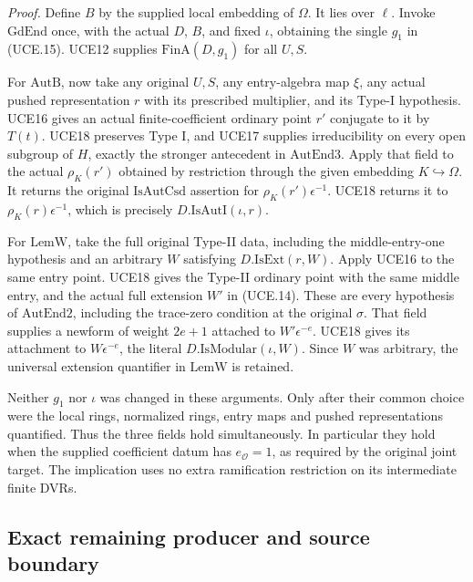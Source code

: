 \emph{Proof.}
Define \(B\) by the supplied local embedding of \(\Omega\).
It lies over \(\ell\).  Invoke \(\mathrm{GdEnd}\) once, with
the actual \(D\), \(B\), and fixed \(\iota\), obtaining the
single \(g_1\) in (UCE.15).  UCE12 supplies
\(\mathrm{FinA}(D,g_1)\) for all \(U,S\).

For \(\mathrm{AutB}\), now take any original \(U,S\), any
entry-algebra map \(\xi\), any actual pushed representation
\(r\) with its prescribed multiplier, and its Type-I hypothesis.
UCE16 gives an actual finite-coefficient ordinary point \(r'\)
conjugate to it by \(T(t)\).  UCE18 preserves Type I, and
UCE17 supplies irreducibility on every open subgroup of
\(H\), exactly the stronger antecedent in
\(\mathrm{AutEnd3}\).  Apply that field to the actual
\(\rho_K(r')\) obtained by restriction through the given
embedding \(K\hookrightarrow\Omega\).  It returns the original
\(\mathrm{IsAutCsd}\) assertion for
\(\rho_K(r')\epsilon^{-1}\).  UCE18 returns it to
\(\rho_K(r)\epsilon^{-1}\), which is precisely
\(D.\mathrm{IsAutI}(\iota,r)\).

For \(\mathrm{LemW}\), take the full original Type-II data,
including the middle-entry-one hypothesis and an arbitrary
\(W\) satisfying \(D.\mathrm{IsExt}(r,W)\).  Apply UCE16
to the same entry point.  UCE18 gives the Type-II ordinary
point with the same middle entry, and the actual full extension
\(W'\) in (UCE.14).  These are every hypothesis of
\(\mathrm{AutEnd2}\), including the trace-zero condition at
the original \(\sigma\).  That field supplies a newform of
weight \(2e+1\) attached to \(W'\epsilon^{-e}\).
UCE18 gives its attachment to \(W\epsilon^{-e}\), the literal
\(D.\mathrm{IsModular}(\iota,W)\).  Since \(W\) was arbitrary,
the universal extension quantifier in \(\mathrm{LemW}\) is retained.

Neither \(g_1\) nor \(\iota\) was changed in these arguments.
Only after their common choice were the local rings, normalized
rings, entry maps and pushed representations quantified.  Thus
the three fields hold simultaneously.  In particular they hold
when the supplied coefficient datum has \(e_{\mathcal O}=1\),
as required by the original joint target.  The implication uses
no extra ramification restriction on its intermediate finite DVRs.

\subsection{Exact remaining producer and source boundary}


